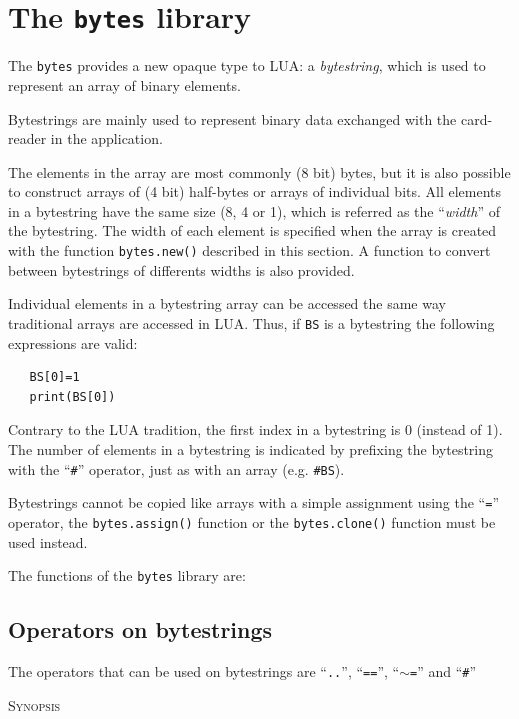 \documentclass[11pt]{report}
\newcommand{\mansection}[1]{\vspace{0.5em}\par\noindent\textsc{#1}\vspace{0.5em}\par}
\begin{document}
\section{The \texttt{bytes} library}

The \texttt{bytes} provides a new opaque type to LUA: a \textit{bytestring}, 
which is used to represent an array of binary elements. 

Bytestrings are mainly used to represent binary data exchanged with
the card-reader in the application.

The elements in the array are most commonly (8 bit) bytes, but
it is also possible to construct arrays of (4 bit) half-bytes or
arrays of individual bits. All elements in a bytestring have the same
size (8, 4 or 1), which is referred as the ``\emph{width}'' of the bytestring.
The width of each element is specified when the array is created 
with the function \texttt{bytes.new()} described in this section. 
A function to convert between bytestrings of differents widths 
is also provided.

Individual elements in a bytestring array can be accessed the same 
way traditional arrays are accessed in LUA. Thus, if \texttt{BS} is
a bytestring the following expressions are valid:

\begin{verbatim}
   BS[0]=1
   print(BS[0])
\end{verbatim} 

Contrary to the LUA tradition, the first index in a bytestring is 0
(instead of 1). The number of elements in a bytestring is indicated 
by prefixing the bytestring with the ``\texttt{\#}'' operator, just as 
with an array (e.g. \texttt{\#BS}).

Bytestrings cannot be copied like arrays with a simple assignment 
using the ``\texttt{=}'' operator, the \texttt{bytes.assign()} function
or the \texttt{bytes.clone()} function must be used instead.  

The functions of the \texttt{bytes} library are:

\subsection{Operators on bytestrings}
  
The operators that can be used on bytestrings are ``\texttt{..}'', ``\texttt{==}'', ``\texttt{$\sim$=}'' and ``\texttt{\#}''

\mansection{Synopsis}
\end{document}
